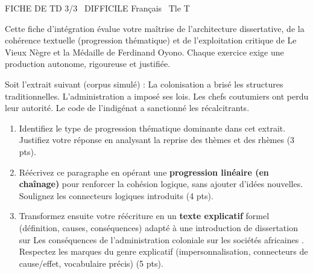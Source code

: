 \documentclass[11pt]{article}
\begin{document}
\begin{tcolorbox}[enhanced,colback=popink,colframe=popink,arc=10pt,boxrule=0pt,left=12pt,right=12pt,top=9pt,bottom=9pt]
{\color{white}\popxbold\small FICHE DE TD 3/3 \textbullet\ DIFFICILE \hfill Français \textbullet\ Tle T\par}
\end{tcolorbox}
\vspace{4pt}
\noindent Cette fiche d'intégration évalue votre maîtrise de l'architecture dissertative, de la cohérence textuelle (progression thématique) et de l'exploitation critique de \og Le Vieux Nègre et la Médaille \fg{} de Ferdinand Oyono. Chaque exercice exige une production autonome, rigoureuse et justifiée.

\begin{exercice}
Soit l'extrait suivant (corpus simulé) : \og La colonisation a brisé les structures traditionnelles. L'administration a imposé ses lois. Les chefs coutumiers ont perdu leur autorité. Le code de l'indigénat a sanctionné les récalcitrants. \fg{}

\begin{enumerate}
    \item Identifiez le type de progression thématique dominante dans cet extrait. Justifiez votre réponse en analysant la reprise des thèmes et des rhèmes (3 pts).
    \item Réécrivez ce paragraphe en opérant une \textbf{progression linéaire (en chaînage)} pour renforcer la cohésion logique, sans ajouter d'idées nouvelles. Soulignez les connecteurs logiques introduits (4 pts).
    \item Transformez ensuite votre réécriture en un \textbf{texte explicatif} formel (définition, causes, conséquences) adapté à une introduction de dissertation sur \og Les conséquences de l'administration coloniale sur les sociétés africaines \fg{}. Respectez les marques du genre explicatif (impersonnalisation, connecteurs de cause/effet, vocabulaire précis) (5 pts).
\end{enumerate}
\end{exercice}
\end{document}
